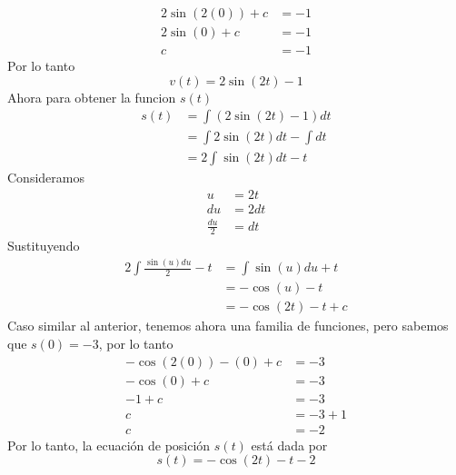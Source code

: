 \documentclass[11pt,letterpaper]{article}
\begin{document}
\begin{equation*}
  \begin{split}
    2\sin(2(0))+c &= -1\\
    2\sin(0)+c &= -1\\
    c &= -1
  \end{split}
\end{equation*}
Por lo tanto
\begin{equation*}
  v(t)=2\sin(2t)-1
\end{equation*}
Ahora para obtener la funcion $s(t)$
\begin{equation*}
  \begin{split}
    s(t)&=\int (2\sin(2t)-1) dt\\
    &= \int 2\sin(2t)dt - \int dt\\
    &= 2\int\sin(2t)dt - t
  \end{split}
\end{equation*}
Consideramos
\begin{equation*}
  \begin{split}
    u &= 2t\\
    du &= 2dt\\
    \frac{du}{2} &= dt
  \end{split}
\end{equation*}
Sustituyendo
\begin{equation*}
  \begin{split}
    2\int \frac{\sin(u)du}{2}-t &= \int \sin(u)du + t\\
    &= -\cos(u)-t\\
    &= -\cos(2t)-t+c
  \end{split}
\end{equation*}
Caso similar al anterior, tenemos ahora una familia de funciones, pero sabemos que $s(0)=-3$, por lo tanto
\begin{equation*}
  \begin{split}
    -\cos(2(0))-(0)+c &= -3\\
    -\cos(0)+c &= -3\\
    -1+c &= -3 \\
    c &= -3 + 1\\
    c &= -2
  \end{split}
\end{equation*}
Por lo tanto, la ecuación de posición $s(t)$ está dada por
\begin{equation*}
  s(t)=-\cos(2t)-t-2
\end{equation*}

\end{document}
